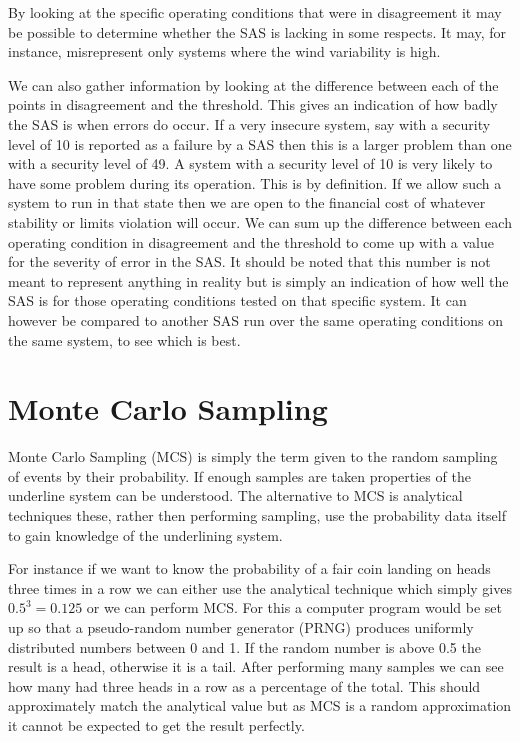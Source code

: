 \documentclass[a4paper,oneside,12pt]{report}
\begin{document}
By looking at the specific operating conditions that were in disagreement it may be possible to determine whether the SAS is lacking in some respects. It may, for instance, misrepresent only systems where the wind variability is high.

We can also gather information by looking at the difference between each of the points in disagreement and the threshold. This gives an indication of how badly the SAS is when errors do occur. If a very insecure system, say with a security level of 10 is reported as a failure by a SAS then this is a larger problem than one with a security level of 49. A system with a security level of 10 is very likely to have some problem during its operation. This is by definition. If we allow such a system to run in that state then we are open to the financial cost of whatever stability or limits violation will occur. We can sum up the difference between each operating condition in disagreement and the threshold to come up with a value for the severity of error in the SAS. It should be noted that this number is not meant to represent anything in reality but is simply an indication of how well the SAS is for those operating conditions tested on that specific system. It can however be compared to another SAS run over the same operating conditions on the same system, to see which is best.

\section{Monte Carlo Sampling}\label{lbl_sec_mcs}

Monte Carlo Sampling (MCS) is simply the term given to the random sampling of events by their probability. If enough samples are taken properties of the underline system can be understood. The alternative to MCS is analytical techniques these, rather then performing sampling, use the probability data itself to gain knowledge of the underlining system.

For instance if we want to know the probability of a fair coin landing on heads three times in a row we can either use the analytical technique which simply gives $0.5^3 = 0.125$ or we can perform MCS. For this a computer program would be set up so that a pseudo-random number generator (PRNG) produces uniformly distributed numbers between 0 and 1. If the random number is above 0.5 the result is a head, otherwise it is a tail. After performing many samples we can see how many had three heads in a row as a percentage of the total. This should approximately match the analytical value but as MCS is a random approximation it cannot be expected to get the result perfectly.
\end{document}

